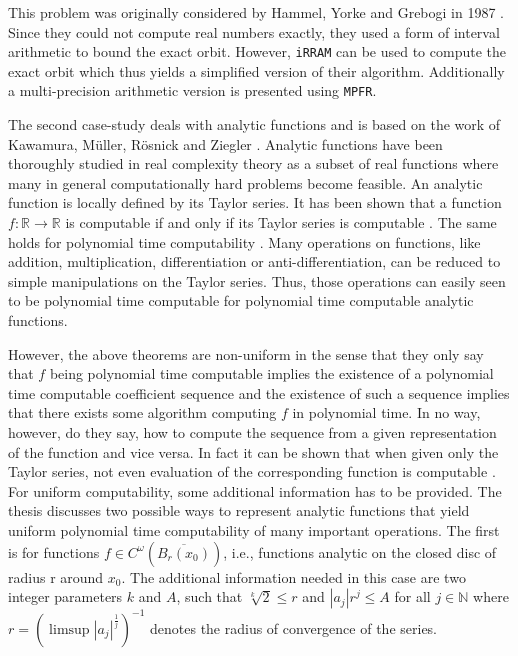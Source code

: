 \documentclass[]{article}
\newcommand{\RR}{\mathbb R}
\newcommand{\NN}{\mathbb N}
\newcommand{\code}{\texttt}
\newcommand{\irram}{\code{iRRAM}\xspace}
\begin{document}
This problem was originally considered by Hammel, Yorke and Grebogi in 1987
\cite{Hammel1987}. 
Since they could not compute real numbers exactly, they used a form of interval
arithmetic to bound the exact orbit.
However, \irram can be used to compute the exact orbit which thus yields a
simplified version of their algorithm.
Additionally a multi-precision arithmetic version is presented using
\code{MPFR}.

The second case-study deals with analytic functions and is based on the work 
of Kawamura, M\"{u}ller, R\"{o}snick and Ziegler \cite{Kawamura}.
Analytic functions have been thoroughly studied in real complexity theory as a
subset of real functions where many in general computationally hard problems become feasible. 
An analytic function is locally defined by its Taylor series.
It has been shown that a function $f: \RR \to \RR$ is computable if and only if its Taylor
series is computable \cite{pour1989computability}.
The same holds for polynomial time computability \cite{mueller1987uniform}.
Many operations on functions, like addition, multiplication, differentiation or
anti-differentiation, can be reduced to simple manipulations on the Taylor
series. Thus, those operations can easily seen to be polynomial time computable for polynomial
time computable analytic functions.

However, the above theorems are non-uniform in the sense that 
they only say that $f$ being polynomial time computable implies the existence of a polynomial time computable 
coefficient sequence and the existence of such a sequence implies that there exists some algorithm computing $f$ in polynomial time.
In no way, however, do they say, how to compute the sequence from a given representation of the function and vice versa.
In fact it can be shown that when given only the Taylor series, not even evaluation of the corresponding function is computable  \cite{mueller1987uniform}. 
For uniform computability, some additional information has to be provided.
The thesis discusses two possible ways to represent analytic functions that yield uniform polynomial
time computability of many important operations.
The first is for functions $f \in C^\omega(\overline{B_r(x_0)})$, i.e., functions analytic on the closed disc of radius r around $x_0$.
The additional information needed in this case are two integer parameters $k$ and $A$, such that
$\sqrt[k]{2} \leq r$ and $|a_j|r^j \leq A$ for all $j \in \NN$ where $r = (\limsup |a_j|^{\frac{1}{j}})^{-1}$ denotes the radius of convergence of the series.
\end{document}
